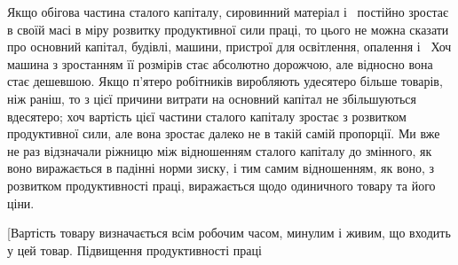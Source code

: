 Якщо обігова частина сталого капіталу, сировинний матеріал
і~ постійно зростає в своїй масі в міру розвитку продуктивної
сили праці, то цього не можна сказати про основний
капітал, будівлі, машини, пристрої для освітлення, опалення і~
Хоч машина з зростанням її розмірів стає абсолютно дорожчою,
але відносно вона стає дешевшою. Якщо п’ятеро робітників
виробляють удесятеро більше товарів, ніж раніш, то
з цієї причини витрати на основний капітал не збільшуються
вдесятеро; хоч вартість цієї частини сталого капіталу зростає
з розвитком продуктивної сили, але вона зростає далеко не в такій
самій пропорції. Ми вже не раз відзначали ріжницю між
відношенням сталого капіталу до змінного, як воно виражається
в падінні норми зиску, і тим самим відношенням, як воно,
з розвитком продуктивності праці, виражається щодо одиничного
товару та його ціни.

[Вартість товару визначається всім робочим часом, минулим
і живим, що входить у цей товар. Підвищення продуктивності праці
\parbreak{}  %
